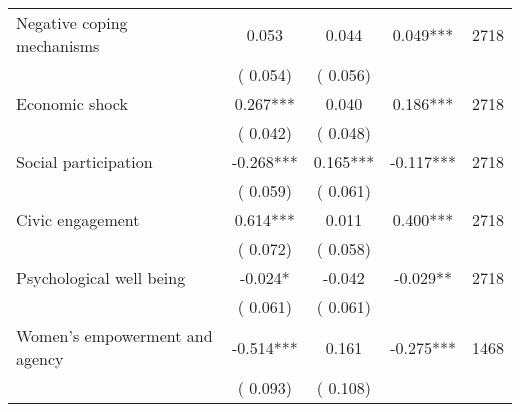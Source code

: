 \begin{tabular}{l*{4}{c}}
 Negative coping mechanisms &              0.053 &         0.044 &           0.049*** & 2718                       \\  
                 &        (       0.054)                   &        (       0.056)                        &                                                             &                                                      \\      

 Economic shock &              0.267*** &         0.040 &           0.186*** & 2718                       \\  
                 &        (       0.042)                   &        (       0.048)                        &                                                             &                                                      \\      

 Social participation &             -0.268*** &         0.165*** &          -0.117*** & 2718                       \\  
                 &        (       0.059)                   &        (       0.061)                        &                                                             &                                                      \\      

 Civic engagement &              0.614*** &         0.011 &           0.400*** & 2718                       \\  
                 &        (       0.072)                   &        (       0.058)                        &                                                             &                                                      \\      

 Psychological well being &             -0.024* &        -0.042 &          -0.029** & 2718                       \\  
                 &        (       0.061)                   &        (       0.061)                        &                                                             &                                                      \\      

 Women's empowerment and agency &             -0.514*** &         0.161 &          -0.275*** & 1468                       \\  
                 &        (       0.093)                   &        (       0.108)                        &                                                             &                                                      \\      


\end{tabular}
